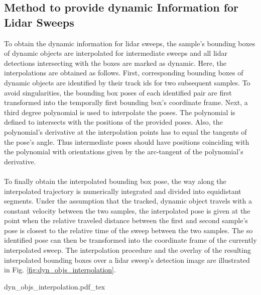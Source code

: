 \subsection{Method to provide dynamic Information for Lidar Sweeps}
\label{subsec:method_dyn_info_for_lidar}
To obtain the dynamic information for lidar sweeps, the sample's bounding boxes of dynamic objects are interpolated for intermediate sweeps and all lidar detections intersecting with the boxes are marked as dynamic. Here, the interpolations are obtained as follows. First, corresponding bounding boxes of dynamic objects are identified by their track ids for two subsequent samples. To avoid singularities, the bounding box poses of each identified pair are first transformed into the temporally first bounding box's coordinate frame. Next, a third degree polynomial is used to interpolate the poses. The polynomial is defined to intersects with the positions of the provided poses. Also, the polynomial's derivative at the interpolation points has to equal the tangents of the pose's angle. Thus intermediate poses should have  positions coinciding with the polynomial with orientations given by the arc-tangent of the polynomial's derivative.
\\\\
To finally obtain the interpolated bounding box pose, the way along the interpolated trajectory is numerically integrated and divided into equidistant segments. Under the assumption that the tracked, dynamic object travels with a constant velocity between the two samples, the interpolated pose is given at the point when the relative traveled distance between the first and second sample's pose is closest to the relative time of the sweep between the two samples. The so identified pose can then be transformed into the coordinate frame of the currently interpolated sweep. The interpolation procedure and the overlay of the resulting interpolated bounding boxes over a lidar sweep's detection image are illustrated in Fig. \ref{fig:dyn_objs_interpolation}.
\begin{center}
	{dyn_objs_interpolation.pdf_tex}
\end{center}
%
